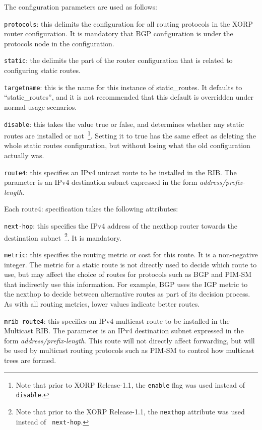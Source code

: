 The configuration parameters are used as follows:
\begin{description}
\item{\tt protocols}: this delimits the configuration for all routing
  protocols in the XORP router configuration.  It is mandatory that
  BGP configuration is under the {\stt protocols} node in the
  configuration.
\item{\tt static}: the delimits the part of the router configuration
  that is related to configuring static routes.
\item{\tt targetname}: this is the name for this instance of
  static\_routes.  It defaults to ``{\stt static\_routes}'', and it is
  not recommended that this default is overridden under normal usage
  scenarios.
\item{\tt disable}: this takes the value {\stt true} or {\stt false},
  and determines whether any static routes are installed or not~\footnote{Note
  that prior to XORP Release-1.1, the {\tt enable} flag was used instead of
  {\tt disable}.}.
  Setting it to {\stt true} has the same effect as deleting the whole
  static routes configuration, but without losing what the old
  configuration actually was.
\item{\tt route4}: this specifies an IPv4 unicast route to be
  installed in the RIB.  The parameter is an IPv4 destination subnet
  expressed in the form {\it address/prefix-length}.

  Each {\stt route4}: specification takes the following attributes:
\begin{description}
\item{\tt next-hop}: this specifies the IPv4 address of the nexthop
  router towards the destination subnet~\footnote{Note that prior to the XORP
  Release-1.1, the {\tt nexthop} attribute was used instead of {\tt
  next-hop}.}. It is mandatory.
\item{\tt metric}: this specifies the routing metric or cost for this
  route.  It is a non-negative integer.  The metric for a static route
  is not directly used to decide which route to use, but may affect
  the choice of routes for protocols such as BGP and PIM-SM that
  indirectly use this information.  For example, BGP uses the IGP
  metric to the nexthop to decide between alternative routes as part
  of its decision process.  As with all routing metrics, lower values
  indicate better routes.
\end{description}
\item{\tt mrib-route4}: this specifies an IPv4 multicast route to be
  installed in the Multicast RIB.  The parameter is an IPv4
  destination subnet expressed in the form {\it
  address/prefix-length}.  This route will not directly affect
  forwarding, but will be used by multicast routing protocols such as
  PIM-SM to control how multicast trees are formed.


\end{description}
